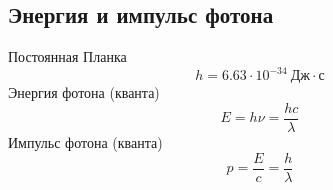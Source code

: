\subsection{Энергия и импульс фотона}

Постоянная Планка
\begin{equation}
h=6.63\cdot 10^{-34}~\text{Дж}\cdot\text{с}
\end{equation}
Энергия фотона (кванта)
\begin{equation}
E=h\nu=\frac{hc}{\lambda}
\end{equation}
Импульс фотона (кванта)
\begin{equation}
p=\frac{E}{c}=\frac{h}{\lambda}
\end{equation}